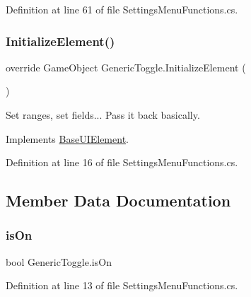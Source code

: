 Definition at line 61 of file Settings\+Menu\+Functions.\+cs.

\mbox{\label{class_generic_toggle_a8c2225448b96a690f72c7a834cb73097}} 
\subsubsection{\texorpdfstring{Initialize\+Element()}{InitializeElement()}}
{\footnotesize\ttfamily override Game\+Object Generic\+Toggle.\+Initialize\+Element (\begin{DoxyParamCaption}{ }\end{DoxyParamCaption})\hspace{0.3cm}{\ttfamily [virtual]}}



Set ranges, set fields... Pass it back basically. 



Implements \hyperlink{class_base_u_i_element_a9a0aa6ac0b194f90e092b372adce4e30}{Base\+U\+I\+Element}.



Definition at line 16 of file Settings\+Menu\+Functions.\+cs.



\subsection{Member Data Documentation}
\mbox{\label{class_generic_toggle_a04dcb99bc5c6b54f7bc880040c337622}} 
\subsubsection{\texorpdfstring{is\+On}{isOn}}
{\footnotesize\ttfamily bool Generic\+Toggle.\+is\+On\hspace{0.3cm}{\ttfamily [protected]}}



Definition at line 13 of file Settings\+Menu\+Functions.\+cs.

\mbox{\label{class_generic_toggle_ad14be04e138af5b154ad5b9d9e98c1d1}} 
